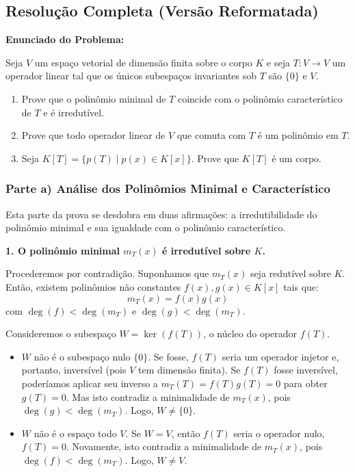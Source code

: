 \subsection*{Resolução Completa (Versão Reformatada)}

\textbf{Enunciado do Problema:}

Seja $V$ um espaço vetorial de dimensão finita sobre o corpo $K$ e seja $T : V \to V$ um operador linear tal que os únicos subespaços invariantes sob $T$ são $\{0\}$ e $V$.

\begin{enumerate}[label=\alph*)]
    \item Prove que o polinômio minimal de $T$ coincide com o polinômio característico de $T$ e é irredutível.
    \item Prove que todo operador linear de $V$ que comuta com $T$ é um polinômio em $T$.
    \item Seja $K[T] = \{ p(T) \mid p(x) \in K[x]\}$. Prove que $K[T]$ é um corpo.
\end{enumerate}

\subsubsection*{Parte a) Análise dos Polinômios Minimal e Característico}

Esta parte da prova se desdobra em duas afirmações: a irredutibilidade do polinômio minimal e sua igualdade com o polinômio característico.

\textbf{1. O polinômio minimal $m_T(x)$ é irredutível sobre $K$.}

Procederemos por contradição. Suponhamos que $m_T(x)$ seja redutível sobre $K$. Então, existem polinômios não constantes $f(x), g(x) \in K[x]$ tais que:
\[
m_T(x) = f(x) g(x)
\]
com $\deg(f) < \deg(m_T)$ e $\deg(g) < \deg(m_T)$.

Consideremos o subespaço $W = \ker(f(T))$, o núcleo do operador $f(T)$.

\begin{itemize}
    \item $W$ não é o subespaço nulo $\{0\}$. Se fosse, $f(T)$ seria um operador injetor e, portanto, inversível (pois $V$ tem dimensão finita). Se $f(T)$ fosse inversível, poderíamos aplicar seu inverso a $m_T(T) = f(T)g(T) = 0$ para obter $g(T) = 0$. Mas isto contradiz a minimalidade de $m_T(x)$, pois $\deg(g) < \deg(m_T)$. Logo, $W \neq \{0\}$.
    \item $W$ não é o espaço todo $V$. Se $W = V$, então $f(T)$ seria o operador nulo, $f(T) = 0$. Novamente, isto contradiz a minimalidade de $m_T(x)$, pois $\deg(f) < \deg(m_T)$. Logo, $W \neq V$.
\end{itemize}

